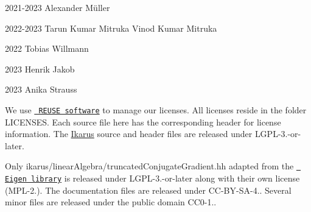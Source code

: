 
\begin{DoxyItemize}
\item 2021-\/2023 Alexander Müller
\item 2022-\/2023 Tarun Kumar Mitruka Vinod Kumar Mitruka
\item 2022 Tobias Willmann
\item 2023 Henrik Jakob
\item 2023 Anika Strauss
\end{DoxyItemize}

We use \href{https://reuse.software/}{\texttt{ REUSE software}} to manage our licenses. All licenses reside in the folder {\ttfamily LICENSES}. Each source file here has the corresponding header for license information. The \mbox{\hyperlink{a00295}{Ikarus}} source and header files are released under {\ttfamily LGPL-\/3.-\/or-\/later}.

Only {\ttfamily ikarus/linear\+Algebra/truncated\+Conjugate\+Gradient.\+hh} adapted from the \href{https://eigen.tuxfamily.org/index.php?title=Main_Page}{\texttt{ Eigen library}} is released under {\ttfamily LGPL-\/3.-\/or-\/later} along with their own license ({\ttfamily MPL-\/2.}). The documentation files are released under {\ttfamily CC-\/\+BY-\/\+SA-\/4.}. Several minor files are released under the public domain {\ttfamily CC0-\/1.}. 